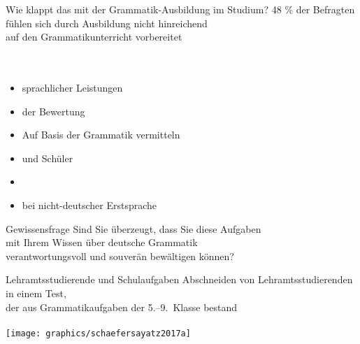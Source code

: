 \begin{frame}
  {Wie klappt das mit der Grammatik-Ausbildung im Studium?}
  \onslide<+->
  \onslide<+->
  \centering 
  \alert{\large 48 \% der Befragten fühlen sich durch Ausbildung nicht hinreichend\\
  auf den Grammatikunterricht vorbereitet}\\
  \Viertelzeile
  \\
  \Zeile
  \onslide<+->
  \\
  \raggedright
  \Zeile
  \begin{itemize}[<+->]
    \item {} sprachlicher Leistungen
    \item {} der Bewertung
    \item Auf Basis der Grammatik  vermitteln
    \item {} und Schüler 
    \item {}
    \item {} bei nicht-deutscher Erstsprache
  \end{itemize}
\end{frame}

\begin{frame}
  {Gewissensfrage}
  \Doppelzeile
  \onslide<+->
  \onslide<+->
  \centering 
  \LARGE
  \alert{Sind Sie überzeugt, dass Sie diese Aufgaben\\
  mit Ihrem Wissen über deutsche Grammatik\\
  verantwortungsvoll und souverän bewältigen können?}
\end{frame}

\begin{frame}
  {Lehramtsstudierende und Schulaufgaben}
  \onslide<+->
  \onslide<+->
  Abschneiden von Lehramtsstudierenden in einem Test,\\
  der aus Grammatikaufgaben der 5.--9.~Klasse bestand\\
  \\
  \onslide<+->
  \centering 
  \texttt{[image: graphics/schaefersayatz2017a]}
\end{frame}

